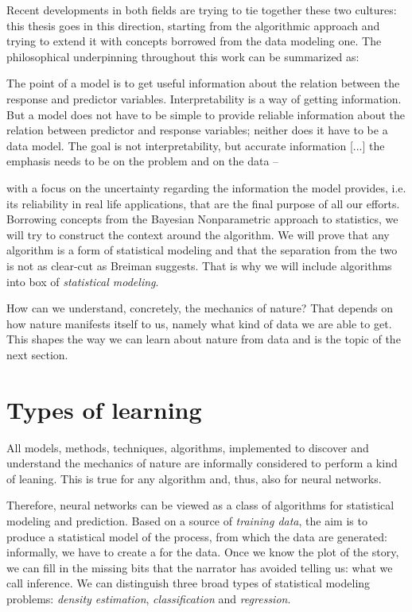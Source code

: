 Recent developments in both fields are trying to tie together these two cultures: this thesis goes in this direction, starting from the algorithmic approach and trying to extend it with concepts borrowed from the data modeling one. The philosophical underpinning throughout this work can be summarized as:
\begin{displayquote}
    The point of a model is to get useful information about the relation between the response and predictor variables. Interpretability is a way of getting information. But a model does not have to be simple to provide reliable information about the relation between predictor and response variables; neither does it have to be a data model. The goal is not interpretability, but accurate information [...] the emphasis needs to be on the problem and on the data -- \cite{Breiman2001}
\end{displayquote}
with a focus on the uncertainty regarding the information the model provides, i.e. its reliability in real life applications, that are the final purpose of all our efforts. Borrowing concepts from the Bayesian Nonparametric approach to statistics, we will try to construct the context around the algorithm. We will prove that any algorithm is a form of statistical modeling and that the separation from the two is not as clear-cut as Breiman suggests. That is why we will include algorithms into box of \textit{statistical modeling}.

How can we understand, concretely, the mechanics of nature? That depends on how nature manifests itself to us, namely what kind of data we are able to get. This shapes the way we can learn about nature from data and is the topic of the next section.




\section{Types of learning}\label{sec:types_of_learning}

All models, methods, techniques, algorithms, implemented to discover and understand the mechanics of nature are informally considered to perform a kind of leaning. This is true for any algorithm and, thus, also for neural networks. 

Therefore, neural networks can be viewed as a class of algorithms for statistical modeling and prediction. Based on a source of \textit{training data}, the aim is to produce a statistical model of the process, from which the data are generated: informally, we have to create a  for the data. Once we know the plot of the story, we can fill in the missing bits that the narrator has avoided telling us: what we call inference. We can distinguish three broad types of statistical modeling problems: \textit{density estimation}, \textit{classification} and \textit{regression}.

